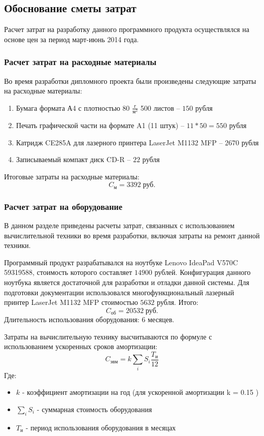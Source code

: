 \documentclass[russian,utf8,emptystyle]{eskdtext}
\begin{document}
\begin{spacing}{1.5}
\subsection{Обоснование сметы затрат}
Расчет затрат на разработку данного программного продукта осуществлялся на основе цен за период март-июнь 2014 года.
\subsubsection{Расчет затрат на расходные материалы}
Во время разработки дипломного проекта были произведены следующие затраты на расходные материалы:
\begin{enumerate}
\item Бумага формата А4 с плотностью 80 $\frac{\text{г}}{\text{м}^2}$ 500 листов -- $150$ рубля
\item Печать графической части на формате A1 (11 штук) -- $11 * 50 = 550$ рубля
\item Катридж CE285A для лазерного принтера LaserJet M1132 MFP -- $2670$ рубля
\item Записываемый компакт диск CD-R -- $22$ рубля
\end{enumerate}
Итоговые затраты на расходные материалы: 
$$
C_\text{м} = 3392 \; \text{руб.}
$$

\subsubsection{Расчет затрат на оборудование}
В данном разделе приведены расчеты затрат, связанных с использованием вычислительной техники во время разработки, включая затраты на ремонт данной техники.

Программный продукт разрабатывался на ноутбуке Lenovo IdeaPad V570C 59319588, стоимость которого составляет $14900$ рублей. Конфигурация данного ноутбука является достаточной для разработки и отладки данной системы. Для подготовки документации использовался многофункциональный лазерный принтер LaserJet M1132 MFP стоимостью $5632$ рубля. Итого:
$$
C_\text{об} = 20532 \; \text{руб.}
$$
Длительность использования оборудования: 6 месяцев.

Затраты на вычислительную технику высчитываются по формуле с использованием ускоренных сроков амортизации:
$$
C_\text{эвм} = k \sum_i S_i \frac{T_\text{и}}{12}
$$
Где:
\begin{itemize}
\item $k$ - коэффициент амортизации на год (для ускоренной амортизации k = 0.15 )
\item $\sum_i S_i$ - суммарная стоимость оборудования
\item $T_\text{и}$ - период использования оборудования в месяцах
\end{itemize}


\end{spacing}
\end{document}
